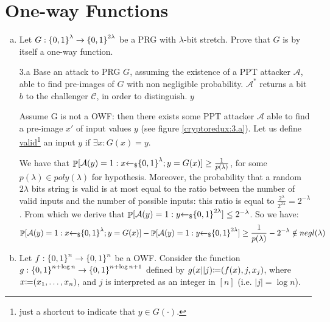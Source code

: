 \section{One-way Functions}
\begin{enumerate}[(a)]
	\item Let $G: {\{0, 1\}}^\lambda \to {\{0, 1\}}^{2\lambda}$ be a PRG with $\lambda$-bit stretch. Prove that $G$ is by itself a one-way function.
	
	\begin{solution}
		\begin{cryptoredux}
			{3.a}
			{Base an attack to PRG $G$, assuming the existence of a PPT attacker $\mathcal{A}$, able to find pre-images of $G$ with non negligible probability. $\mathcal{A}^*$ returns a bit $b$ to the challenger $\mathcal{C}$, in order to distinguish.}
			{}
			{}
			{}
			{$y$}{}
			\cseqdelay
		\end{cryptoredux}
		Assume G is not a OWF: then there exists some PPT attacker $\mathcal{A}$ able to find a pre-image $x'$ of input values $y$ (see figure \ref{cryptoredux:3.a}).
		Let us define \underline{valid}\footnote{just a shortcut to indicate that $y \in G(\cdot)$.} an input $y$ if $\exists x: G(x) = y$.
	
		We have that $\mathop{\mathbb P}[\mathcal{A}(y) = 1: x {\leftarrow_\$} {\{0, 1\}}^\lambda; y = G(x)] \ge \frac{1}{p(\lambda)}$, for some $p(\lambda) \in poly(\lambda)$ for hypothesis.
		Moreover, the probability that a random $2\lambda$ bits string is valid is at most equal to the ratio between the number of valid inputs and the number of possible inputs: this ratio is equal to $\frac{2^\lambda}{2^{2\lambda}} = 2^{-\lambda}$.
		From which we derive that $\mathop{\mathbb P}[\mathcal{A}(y) = 1: y {\leftarrow_\$} {\{0, 1\}}^{2\lambda}] \le 2^{-\lambda}$.
		So we have:
		\[\mathop{\mathbb P}[\mathcal{A}(y) = 1: x {\leftarrow_\$} {\{0, 1\}}^\lambda; y = G(x)] - \mathop{\mathbb P}[\mathcal{A}(y) = 1: y {\leftarrow_\$} {\{0, 1\}}^{2\lambda}] \ge \frac{1}{p(\lambda)} - 2^{-\lambda} \notin negl(\lambda) \]
	\end{solution}

	\item Let $f: {\{0, 1\}}^n \to {\{0, 1\}}^n$ be a OWF. Consider the function $g: {\{0, 1\}}^{n + \log{n}} \to {\{0, 1\}}^{n + \log{n} + 1}$ defined by $g(x||j) {\coloneqq} (f(x), j, x_j)$, where $x {\coloneqq} (x_1, \dots, x_n)$, and $j$ is interpreted as an integer in $[n]$ (i.e. $|j| = \log n$).
	

\end{enumerate}
